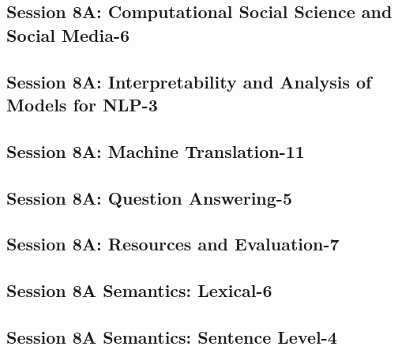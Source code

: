 \subsection{\large Session 8A: Computational Social Science and Social Media-6}
\label{parallel-session-8A-trackA}
\TrackALoc\hfill\sessionchair{}{}
\clearpage
\subsection{\large Session 8A: Interpretability and Analysis of Models for NLP-3}
\label{parallel-session-8A-trackB}
\TrackBLoc\hfill\sessionchair{}{}
\clearpage
\subsection{\large Session 8A: Machine Translation-11}
\label{parallel-session-8A-trackC}
\TrackCLoc\hfill\sessionchair{}{}
\clearpage
\subsection{\large Session 8A: Question Answering-5}
\label{parallel-session-8A-trackD}
\TrackDLoc\hfill\sessionchair{}{}
\clearpage
\subsection{\large Session 8A: Resources and Evaluation-7}
\label{parallel-session-8A-trackE}
\TrackELoc\hfill\sessionchair{}{}
\clearpage
\subsection{\large Session 8A Semantics: Lexical-6}
\label{parallel-session-8A-trackF}
\TrackFLoc\hfill\sessionchair{}{}
\clearpage
\subsection{\large Session 8A Semantics: Sentence Level-4}
\label{parallel-session-8A-trackG}
\TrackGLoc\hfill\sessionchair{}{}
\clearpage
